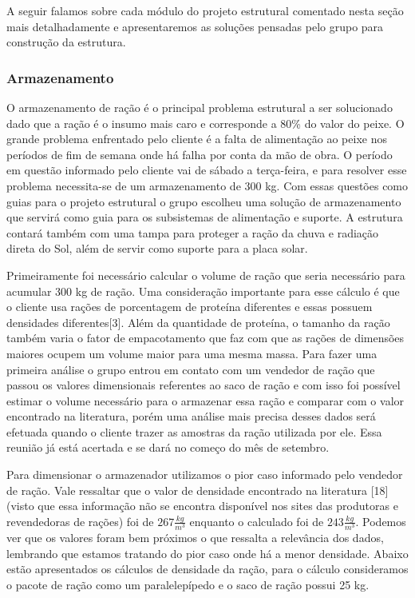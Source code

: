 A seguir falamos sobre cada módulo do projeto estrutural comentado nesta seção mais detalhadamente e apresentaremos as soluções pensadas pelo grupo para construção da estrutura.

\subsubsection{Armazenamento}

O armazenamento de ração é o principal problema estrutural a ser solucionado dado que a ração é o insumo mais caro e corresponde a 80\% do valor do peixe. O grande problema enfrentado pelo cliente é a falta de alimentação ao peixe nos períodos de fim de semana onde há falha por conta da mão de obra. O período em questão informado pelo cliente vai de sábado a terça-feira, e para resolver esse problema necessita-se de um armazenamento de 300 kg. Com essas questões como guias para o projeto estrutural o grupo escolheu uma solução de armazenamento que servirá como guia para os subsistemas de alimentação e suporte. A estrutura contará também com uma tampa para proteger a ração da chuva e radiação direta do Sol, além de servir como suporte para a placa solar.

Primeiramente foi necessário calcular o volume de ração que seria necessário para acumular 300 kg de ração. Uma consideração importante para esse cálculo é que o cliente usa rações de porcentagem de proteína diferentes e essas possuem densidades diferentes[3]. Além da quantidade de proteína, o tamanho da ração também varia o fator de empacotamento que faz com que as rações de dimensões maiores ocupem um volume maior para uma mesma massa. Para fazer uma primeira análise o grupo entrou em contato com um vendedor de ração que passou os valores dimensionais referentes ao saco de ração e com isso foi possível estimar o volume necessário para o armazenar essa ração e comparar com o valor encontrado na literatura, porém uma análise mais precisa desses dados será efetuada quando o cliente trazer as amostras da ração utilizada por ele. Essa reunião já está acertada e se dará no começo do mês de setembro.


Para dimensionar o armazenador utilizamos o pior caso informado pelo vendedor de ração. Vale ressaltar que o valor de densidade encontrado na literatura [18] (visto que essa informação não se encontra disponível nos sites das produtoras e revendedoras de rações) foi de $267 \frac{kg}{m^3}$ enquanto o calculado foi de $243 \frac{kg}{m^3}$. Podemos ver que os valores foram bem próximos o que ressalta a relevância dos dados, lembrando que estamos tratando do pior caso onde há a menor densidade. Abaixo estão apresentados os cálculos de densidade da ração, para o cálculo consideramos o pacote de ração como um paralelepípedo e o saco de ração possui 25 kg.

